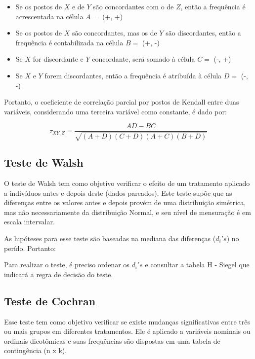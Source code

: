 \documentclass[
  portuguese,
]{estat/estat}
\begin{document}
\begin{itemize}
    \item Se os postos de $X$ e de $Y$ são concordantes com o de $Z$, então a frequência é acrescentada na célula $A =$ (+, +)
    
    \item Se os postos de $X$ são concordantes, mas os de $Y$ são discordantes, então a frequência é contabilizada na célula $B =$ (+, -)
    
    \item Se $X$ for discordante e $Y$ concordante, será somado à célula $C =$ (-, +)
    
    \item Se $X$ e $Y$ forem discordantes, então a frequência é atribuída à célula $D =$ (-, -)
\end{itemize}

Portanto, o coeficiente de correlação parcial por postos de Kendall
entre duas variáveis, considerando uma terceira variável como constante,
é dado por:

\[ \tau_{XY, Z} = \frac{AD - BC}{\sqrt{(A + D)(C + D)(A + C)(B + D)}} \]

\subsection{Teste de Walsh}\label{teste-de-walsh}

O teste de Walsh tem como objetivo verificar o efeito de um tratamento
aplicado a indivíduos antes e depois deste (dados pareados). Este teste
supõe que as diferenças entre os valores antes e depois provém de uma
distribuição simétrica, mas não necessariamente da distribuição Normal,
e seu nível de mensuração é em escala intervalar.

As hipóteses para esse teste são baseadas na mediana das diferenças
(\(d_{i}'s\)) no perído. Portanto:


Para realizar o teste, é preciso ordenar os \(d_{i}'s\) e consultar a
tabela H - Siegel que indicará a regra de decisão do teste.

\subsection{Teste de Cochran}\label{teste-de-cochran}

Esse teste tem como objetivo verificar se existe mudanças significativas
entre três ou mais grupos em diferentes tratamentos. Ele é aplicado a
variáveis nominais ou ordinais dicotômicas e suas frequências são
dispostas em uma tabela de contingência (n x k).
\end{document}
